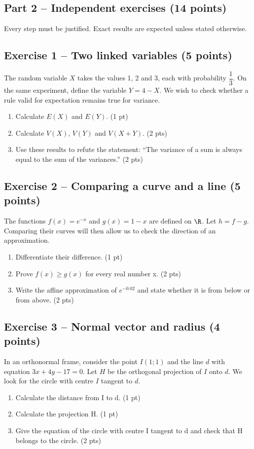 \clearpage\subsection*{Part 2 -- Independent exercises (14 points)}
Every step must be justified. Exact results are expected unless stated otherwise.
\subsection*{Exercise 1 -- Two linked variables (5 points)}
The random variable $X$ takes the values 1, 2 and 3, each with probability $\dfrac13$. On the same experiment, define the variable $Y=4-X$. We wish to check whether a rule valid for expectation remains true for variance.
\begin{enumerate}
\item Calculate $E(X)$ and $E(Y)$. \hfill(1 pt)
\item Calculate $V(X)$, $V(Y)$ and $V(X+Y)$. \hfill(2 pts)
\item Use these results to refute the statement: ``The variance of a sum is always equal to the sum of the variances.'' \hfill(2 pts)
\end{enumerate}
\subsection*{Exercise 2 -- Comparing a curve and a line (5 points)}
The functions $f(x)=e^{-x}$ and $g(x)=1-x$ are defined on $\R$. Let $h=f-g$. Comparing their curves will then allow us to check the direction of an approximation.
\begin{enumerate}
\item Differentiate their difference. \hfill(1 pt)
\item Prove $f(x)\geq g(x)$ for every real number x. \hfill(2 pts)
\item Write the affine approximation of $e^{-0.02}$ and state whether it is from below or from above. \hfill(2 pts)
\end{enumerate}
\subsection*{Exercise 3 -- Normal vector and radius (4 points)}
In an orthonormal frame, consider the point $I(1;1)$ and the line $d$ with equation $3x+4y-17=0$. Let $H$ be the orthogonal projection of $I$ onto $d$. We look for the circle with centre $I$ tangent to $d$.
\begin{enumerate}
\item Calculate the distance from I to d. \hfill(1 pt)
\item Calculate the projection H. \hfill(1 pt)
\item Give the equation of the circle with centre I tangent to d and check that H belongs to the circle. \hfill(2 pts)
\end{enumerate}
